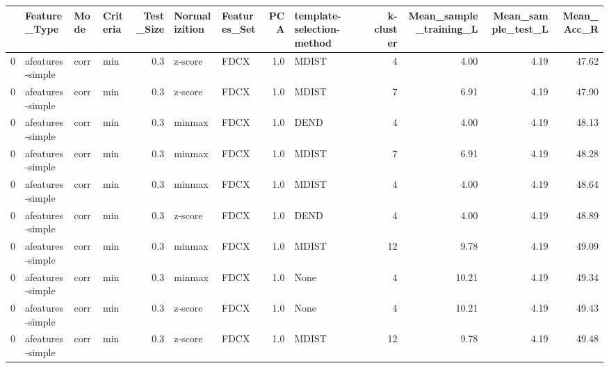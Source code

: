 \begin{tabular}{llllrllrlrrrr}
\toprule
{} &      Feature\_Type &  Mode & Criteria &  Test\_Size & Normalizition & Features\_Set &  PCA & template-selection-method &  k-cluster &  Mean\_sample\_training\_L &  Mean\_sample\_test\_L &  Mean\_Acc\_R \\
\midrule
0 &  afeatures-simple &  corr &      min &        0.3 &       z-score &         FDCX &  1.0 &                     MDIST &          4 &                    4.00 &                4.19 &       47.62 \\
0 &  afeatures-simple &  corr &      min &        0.3 &       z-score &         FDCX &  1.0 &                     MDIST &          7 &                    6.91 &                4.19 &       47.90 \\
0 &  afeatures-simple &  corr &      min &        0.3 &        minmax &         FDCX &  1.0 &                      DEND &          4 &                    4.00 &                4.19 &       48.13 \\
0 &  afeatures-simple &  corr &      min &        0.3 &        minmax &         FDCX &  1.0 &                     MDIST &          7 &                    6.91 &                4.19 &       48.28 \\
0 &  afeatures-simple &  corr &      min &        0.3 &        minmax &         FDCX &  1.0 &                     MDIST &          4 &                    4.00 &                4.19 &       48.64 \\
0 &  afeatures-simple &  corr &      min &        0.3 &       z-score &         FDCX &  1.0 &                      DEND &          4 &                    4.00 &                4.19 &       48.89 \\
0 &  afeatures-simple &  corr &      min &        0.3 &        minmax &         FDCX &  1.0 &                     MDIST &         12 &                    9.78 &                4.19 &       49.09 \\
0 &  afeatures-simple &  corr &      min &        0.3 &        minmax &         FDCX &  1.0 &                      None &          4 &                   10.21 &                4.19 &       49.34 \\
0 &  afeatures-simple &  corr &      min &        0.3 &       z-score &         FDCX &  1.0 &                      None &          4 &                   10.21 &                4.19 &       49.43 \\
0 &  afeatures-simple &  corr &      min &        0.3 &       z-score &         FDCX &  1.0 &                     MDIST &         12 &                    9.78 &                4.19 &       49.48 \\
\bottomrule
\end{tabular}
